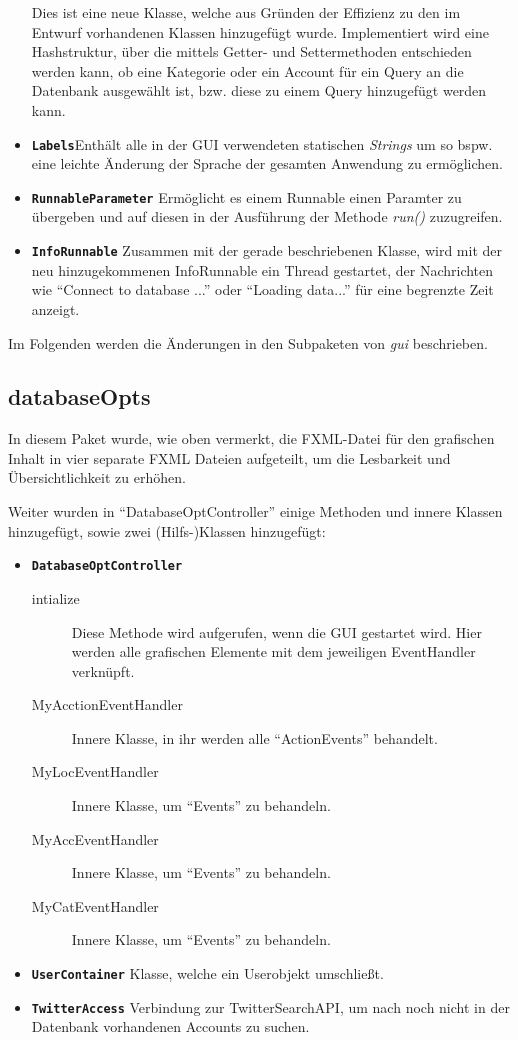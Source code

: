 \begin{itemize}
	Dies ist eine neue Klasse, welche aus Gründen der Effizienz zu den im Entwurf vorhandenen Klassen hinzugefügt wurde. Implementiert wird eine Hashstruktur, über die mittels Getter- und Settermethoden entschieden werden kann, ob eine Kategorie oder ein Account für ein Query an die Datenbank ausgewählt ist, bzw. diese zu einem Query hinzugefügt werden kann.
	\item \textbf{\lstinline{Labels}}\quad Enthält alle in der GUI verwendeten statischen \emph{Strings} um so bspw. eine leichte Änderung der Sprache der gesamten Anwendung zu ermöglichen.
	\item \textbf{\lstinline{RunnableParameter}} Ermöglicht es einem Runnable einen Paramter zu übergeben und auf diesen in der Ausführung der Methode \emph{run()} zuzugreifen.
	\item \textbf{\lstinline{InfoRunnable}} \quad Zusammen mit der gerade beschriebenen Klasse, wird mit der neu hinzugekommenen InfoRunnable ein Thread gestartet, der Nachrichten wie "`Connect to database ..."' oder "`Loading data..."' für eine begrenzte Zeit anzeigt.
\end{itemize}

Im Folgenden werden die Änderungen in den Subpaketen von \emph{gui} beschrieben.

\subsection{databaseOpts}
In diesem Paket wurde, wie oben vermerkt, die FXML-Datei für den grafischen Inhalt in vier separate FXML Dateien aufgeteilt, um die Lesbarkeit und Übersichtlichkeit zu erhöhen.


Weiter wurden in "`DatabaseOptController"' einige Methoden und innere Klassen hinzugefügt, sowie zwei (Hilfs-)Klassen hinzugefügt:
\begin{itemize}
	\item \textbf{\lstinline{DatabaseOptController}}
	\quad
	\begin{description}
		\item[intialize]
		\quad
		Diese Methode wird aufgerufen, wenn die GUI gestartet wird. Hier werden alle grafischen Elemente mit dem jeweiligen EventHandler verknüpft.
	
			\item[MyAcctionEventHandler] Innere Klasse, in ihr werden alle "`ActionEvents"' behandelt. 
			\item[MyLocEventHandler] Innere Klasse, um "`Events"' zu behandeln.
			\item[MyAccEventHandler] Innere Klasse, um "`Events"' zu behandeln.
			\item[MyCatEventHandler] Innere Klasse, um "`Events"' zu behandeln.
		\end{description}
	\item \textbf{\lstinline{UserContainer}} Klasse, welche ein Userobjekt umschließt.
	\item \textbf{\lstinline{TwitterAccess}} Verbindung zur TwitterSearchAPI, um nach noch nicht in der Datenbank vorhandenen Accounts zu suchen.
\end{itemize}
	
